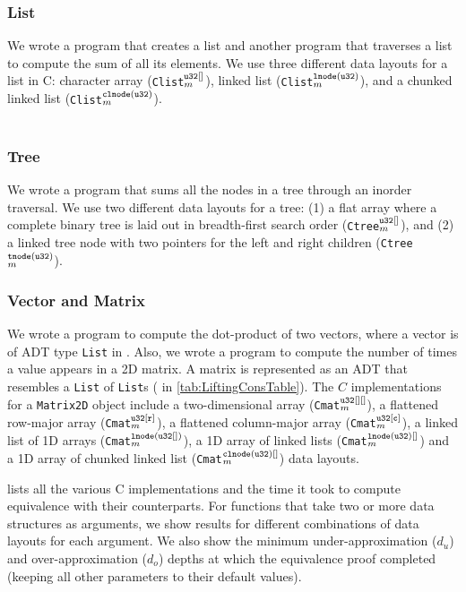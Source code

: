 \subsubsection*{List} We wrote a \SpecL{} program that creates a list and another \SpecL{}
program that traverses a list to compute the sum of all its elements. We use three different
data layouts for a list in C: character array ({\tt Clist}$_m^{\tt u32[]}$),
linked list ({\tt Clist}$_m^{\tt lnode(u32)}$), and
a chunked linked list ({\tt Clist}$_m^{\tt clnode(u32)}$).
\\ \\
\subsubsection*{Tree} We wrote a \SpecL{} program that sums all the nodes in a tree
through an inorder traversal. We use two different data layouts for a tree: 
(1) a flat array where a
complete binary tree is laid out in breadth-first search order ({\tt Ctree}$_m^{\tt u32[]}$),
and (2) a linked tree node with two pointers for the left and right children ({\tt Ctree}$_m^{\tt tnode(u32)}$).

\subsubsection*{Vector and Matrix} We wrote a \SpecL{} program to compute the dot-product
of two vectors, where a vector is of ADT type {\tt List} in \SpecL{}. Also, we wrote a
\SpecL{} program to compute the number of times a value appears in a 2D matrix. A
matrix is represented as an ADT that resembles a {\tt List} of {\tt List}s ( in \cref{tab:LiftingConsTable}).
The $C$ implementations for a {\tt Matrix2D} object include
a two-dimensional array ({\tt Cmat}$^{\tt u32[][]}_m$), a flattened row-major array ({\tt Cmat}$^{\tt u32[r]}_m$),
a flattened column-major array ({\tt Cmat}$^{\tt u32[c]}_m$), a linked list of 1D arrays ({\tt Cmat}$^{\tt lnode(u32[])}_m$),
a 1D array of linked lists ({\tt Cmat}$^{\tt lnode(u32)[]}_m$) and a 1D array of chunked linked list ({\tt Cmat}$^{\tt clnode(u32)[]}_m$)
data layouts.


 lists all the various C implementations and the time it took
to compute equivalence with their \SpecL{} counterparts. For functions that
take two or more data structures as arguments, we show
results for different combinations of data layouts for each argument.
We also show the minimum under-approximation ($d_u$) and over-approximation ($d_o$) depths
at which the equivalence proof completed (keeping all other parameters to their
default values).

